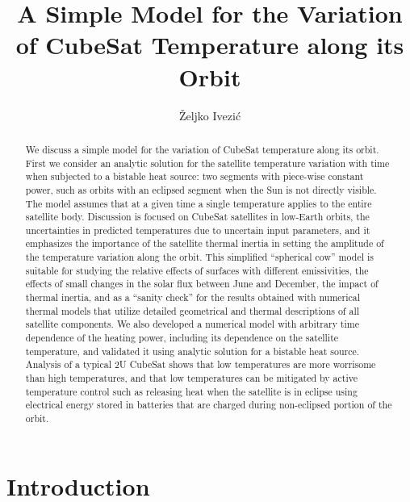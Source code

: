 \documentclass[]{aastex62}
\begin{document}
\title{A Simple Model for the Variation of CubeSat Temperature along its Orbit}  
 

\author[0000-0001-5250-2633]{\v{Z}eljko Ivezi\'{c}}

\begin{abstract}
We discuss a simple model for the variation of CubeSat temperature along its orbit. First 
we consider an analytic solution for the satellite temperature variation with time when subjected to 
a bistable heat source: two segments with piece-wise constant power, such as orbits with an eclipsed 
segment when the Sun is not directly visible. The model assumes that at a given time a single 
temperature applies to the entire satellite body. Discussion is focused on CubeSat satellites in 
low-Earth orbits, the uncertainties in predicted temperatures due to uncertain input parameters, and 
it emphasizes the importance of the satellite thermal inertia in setting the amplitude of the temperature 
variation along the orbit. This simplified ``spherical cow'' model is suitable for studying the relative 
effects of surfaces with different emissivities, the effects of small changes in the solar flux between 
June and December, the impact of thermal inertia, and as a ``sanity check'' for the results obtained 
with numerical thermal models that utilize detailed geometrical and thermal descriptions of all satellite 
components. We also developed a numerical model with arbitrary time dependence of the heating power, including its 
dependence on the satellite temperature, and validated it using analytic solution for a bistable heat 
source. Analysis of a typical 2U CubeSat shows that low temperatures are more worrisome than
high temperatures, and that low temperatures can be mitigated by active temperature control such
as releasing heat when the satellite is in eclipse using electrical energy stored in batteries that
are charged during non-eclipsed portion of the orbit. 
\end{abstract}



\section{Introduction} 
 
\end{document}
